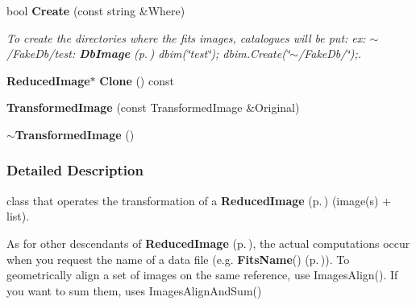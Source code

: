 \begin{CompactItemize}
\item 
{}
bool {\bf Create} (const string \&Where)\label{class_transformedimage_a16}

\begin{CompactList}\small\item\em To create the directories where the fits images, catalogues will be put: ex: $\sim$/Fake\-Db/test: {\bf Db\-Image} {\rm (p.\,\pageref{class_dbimage})} dbim(\char`\"{}test\char`\"{}); dbim.Create(\char`\"{}$\sim$/Fake\-Db/\char`\"{});.\item\end{CompactList}\item 
{}
{\bf Reduced\-Image}$\ast$ {\bf Clone} () const\label{class_transformedimage_a17}

\item 
{}
{\bf Transformed\-Image} (const Transformed\-Image \&Original)\label{class_transformedimage_a18}

\item 
{}
{\bf $\sim$Transformed\-Image} ()\label{class_transformedimage_a19}

\end{CompactItemize}


\subsubsection{Detailed Description}
class that operates the transformation of a {\bf Reduced\-Image} {\rm (p.\,\pageref{class_reducedimage})} (image(s) + list).

As for other descendants of {\bf Reduced\-Image} {\rm (p.\,\pageref{class_reducedimage})}, the actual computations occur when you request the name of a data file (e.g. {\bf Fits\-Name}() {\rm (p.\,\pageref{class_reducedimage_a14})}). To geometrically align a set of images on the same reference, use Images\-Align(). If you want to sum them, uses Images\-Align\-And\-Sum() 



